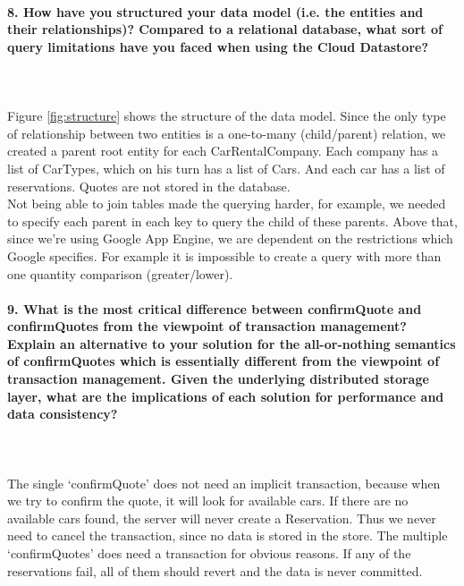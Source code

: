 \documentclass{ds-report}
\begin{document}
	\paragraph{8. How have you structured your data model (i.e. the entities and their relationships)? Compared to a relational database, what sort of query limitations have you faced when using the Cloud Datastore?} \mbox{}\\\\
	Figure \ref{fig:structure} shows the structure of the data model. Since the only type of relationship between two entities is a one-to-many (child/parent) relation, we created a parent root entity for each CarRentalCompany. Each company has a list of CarTypes, which on his turn has a list of Cars. And each car has a list of reservations. Quotes are not stored in the database.\\
Not being able to join tables made the querying harder, for example, we needed to specify each parent in each key to query the child of these parents. Above that, since we're using Google App Engine, we are dependent on the restrictions which Google specifies. For example it is impossible to create a query with more than one quantity comparison (greater/lower). 
	


	\paragraph{9. What is the most critical difference between confirmQuote and confirmQuotes from the viewpoint of transaction management? Explain an alternative to your solution for the all-or-nothing semantics of confirmQuotes which is essentially different from the viewpoint of transaction management. Given the underlying distributed storage layer, what are the implications of each solution for performance and data consistency?} \mbox{}\\\\
	The single `confirmQuote' does not need an implicit transaction, because when we try to confirm the quote, it will look for available cars. If there are no available cars found, the server will never create a Reservation. Thus we never need to cancel the transaction, since no data is stored in the store.
	The multiple `confirmQuotes' does need a transaction for obvious reasons. If any of the reservations fail, all of them should revert and the data is never committed. \mbox{}\\\\
	
\end{document}
